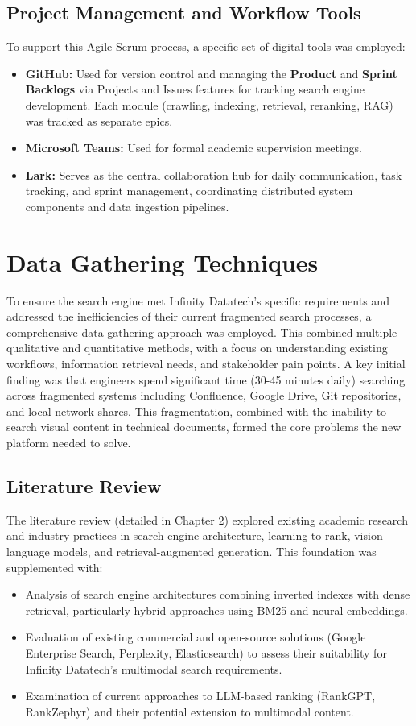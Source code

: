 \documentclass{report}
\begin{document}
\subsection{Project Management and Workflow Tools}
To support this Agile Scrum process, a specific set of digital tools was employed:
\begin{itemize}
\item \textbf{GitHub:} Used for version control and managing the \textbf{Product} and \textbf{Sprint Backlogs} via Projects and Issues features for tracking search engine development. Each module (crawling, indexing, retrieval, reranking, RAG) was tracked as separate epics.
\item \textbf{Microsoft Teams:} Used for formal academic supervision meetings.
\item \textbf{Lark:} Serves as the central collaboration hub for daily communication, task tracking, and sprint management, coordinating distributed system components and data ingestion pipelines.
\end{itemize}


\section{Data Gathering Techniques}
To ensure the search engine met Infinity Datatech's specific requirements and addressed the inefficiencies of their current fragmented search processes, a comprehensive data gathering approach was employed. This combined multiple qualitative and quantitative methods, with a focus on understanding existing workflows, information retrieval needs, and stakeholder pain points. A key initial finding was that engineers spend significant time (30-45 minutes daily) searching across fragmented systems including Confluence, Google Drive, Git repositories, and local network shares. This fragmentation, combined with the inability to search visual content in technical documents, formed the core problems the new platform needed to solve.

\subsection{Literature Review}
The literature review (detailed in Chapter 2) explored existing academic research and industry practices in search engine architecture, learning-to-rank, vision-language models, and retrieval-augmented generation. This foundation was supplemented with:

\begin{itemize}
    \item Analysis of search engine architectures combining inverted indexes with dense retrieval, particularly hybrid approaches using BM25 and neural embeddings.
    \item Evaluation of existing commercial and open-source solutions (Google Enterprise Search, Perplexity, Elasticsearch) to assess their suitability for Infinity Datatech's multimodal search requirements.
    \item Examination of current approaches to LLM-based ranking (RankGPT, RankZephyr) and their potential extension to multimodal content.
\end{itemize}
\end{document}
